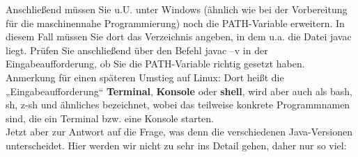Anschließend müssen Sie u.U. unter Windows (ähnlich wie bei der Vorbereitung für die maschinennahe Programmierung) noch die PATH-Variable erweitern. In diesem Fall müssen Sie dort das Verzeichnis angeben, in dem u.a. die Datei javac liegt. Prüfen Sie anschließend über den Befehl javac –v in der Eingabeaufforderung, ob Sie die PATH-Variable richtig gesetzt haben. Anmerkung für einen späteren Umstieg auf Linux: Dort heißt die „Eingabeaufforderung“ \textbf{Terminal}, \textbf{Konsole} oder \textbf{shell}, wird aber auch als bash, sh, z-sh und ähnliches bezeichnet, wobei das teilweise konkrete Programmnamen sind, die ein Terminal bzw. eine Konsole starten.\\

Jetzt aber zur Antwort auf die Frage, was denn die verschiedenen Java-Versionen unterscheidet. Hier werden wir nicht zu sehr ins Detail gehen, daher nur so viel: 

